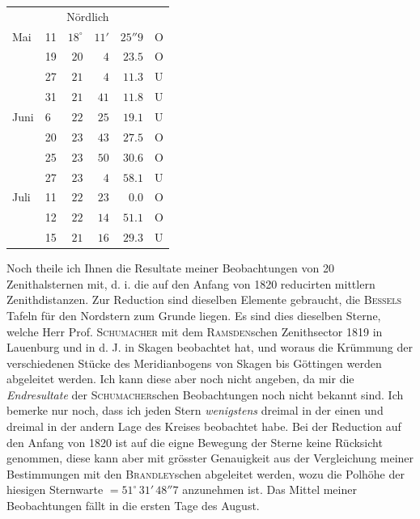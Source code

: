 \begin{center}
\begin{tabular}{ll|r r r l}
\multicolumn{6}{c}{Nördlich} \\
Mai & 11 & $18^\circ$ & $11'$ & $25''9$ & O \\
 & 19 & $20$ & $4$ & $23.5$ & O \\
 & 27 & $21$ & $4$ & $11.3$ & U \\
 & 31 & $21$ & $41$ & $11.8$ & U \\
Juni & 6 & $22$ & $25$ & $19.1$ & U \\
 & 20 & $23$ & $43$ & $27.5$ & O \\
 & 25 & $23$ & $50$ & $30.6$ & O \\
 & 27 & $23$ & $4$ & $58.1$ & U \\
Juli & 11 & $22$ & $23$ & $0.0$ & O \\
 & 12 & $22$ & $14$ & $51.1$ & O \\
 & 15 & $21$ & $16$ & $29.3$ & U \\
\end{tabular}
\end{center}

Noch theile ich Ihnen die Resultate meiner Beobachtungen von 20 Zenithalsternen mit,
d. i. die auf den Anfang von 1820 reducirten mittlern Zenithdistanzen. Zur Reduction
sind dieselben Elemente gebraucht, die \textsc{Bessels} Tafeln für den Nordstern zum
Grunde liegen. Es sind dies dieselben Sterne, welche Herr Prof. \textsc{Schumacher} mit
dem \textsc{Ramsden}schen Zenithsector 1819 in Lauenburg und in d. J. in Skagen
beobachtet hat, und woraus die Krümmung der verschiedenen Stücke des Meridianbogens von
Skagen bis Göttingen werden abgeleitet werden. Ich kann diese aber noch nicht angeben,
da mir die \emph{Endresultate} der \textsc{Schumacher}schen Beobachtungen noch nicht
bekannt sind. Ich bemerke nur noch, dass ich jeden Stern \emph{wenigstens} dreimal in
der einen und dreimal in der andern Lage des Kreises beobachtet habe. Bei der Reduction
auf den Anfang von 1820 ist auf die eigne Bewegung der Sterne keine Rücksicht genommen,
diese kann aber mit grösster Genauigkeit aus der Vergleichung meiner Bestimmungen mit
den \textsc{Brandley}schen
abgeleitet werden, wozu die Polhöhe der hiesigen Sternwarte $=51^\circ\,31'\,48''7$
anzunehmen ist. Das Mittel meiner Beobachtungen fällt in die ersten Tage des August.

